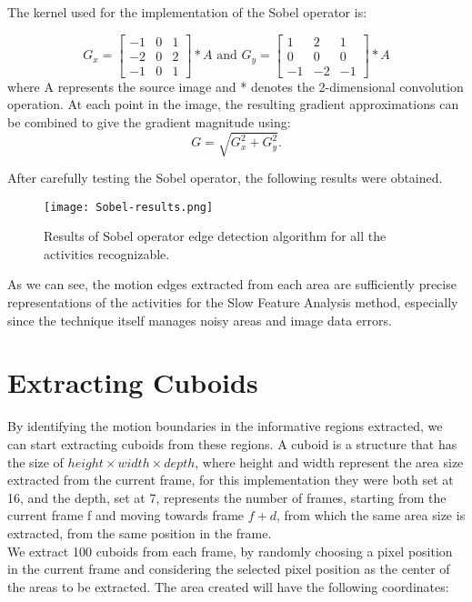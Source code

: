 \documentclass[11pt]{report}
\begin{document}
The kernel used for the implementation of the Sobel operator is:

\begin{equation}
G_x = \begin{bmatrix} -1 & 0 & 1 \\ -2 & 0 & 2 \\ -1 & 0 & 1 \end{bmatrix} * A
\text{ and }
G_y =  \begin{bmatrix} 1 & 2 & 1 \\ 0 & 0 & 0 \\ -1 &-2 & -1 \end{bmatrix} * A
\end{equation}
where A represents the source image and * denotes the 2-dimensional convolution operation. At each point in the image, the resulting gradient approximations can be combined to give the gradient magnitude using:
\begin{equation}
G = \sqrt{G_x^2 + G_y^2}. 
\end{equation}


After carefully testing the Sobel operator, the following results were obtained. \\

\begin{figure}
    \centering
    \texttt{[image: Sobel-results.png]}
    \caption{Results of Sobel operator edge detection algorithm for all the activities recognizable.}
    \label{fig:Sobel-results}
\end{figure}

As we can see, the motion edges extracted from each area are sufficiently precise representations of the activities for the Slow Feature Analysis method, especially since the technique itself manages noisy areas and image data errors. \\

\section{Extracting Cuboids}
By identifying the motion boundaries in the informative regions extracted, we can start extracting cuboids from these regions. A cuboid is a structure that has the size of \(height \times width \times depth\), where height and width represent the area size extracted from the current frame, for this implementation they were both set at 16, and the depth, set at 7, represents the number of frames, starting from the current frame f and moving towards frame \(f + d\), from which the same area size is extracted, from the same position in the frame. \\
We extract 100 cuboids from each frame, by randomly choosing a pixel position in the current frame and considering the selected pixel position as the center of the areas to be extracted. The area created will have the following coordinates: \\
\end{document}
